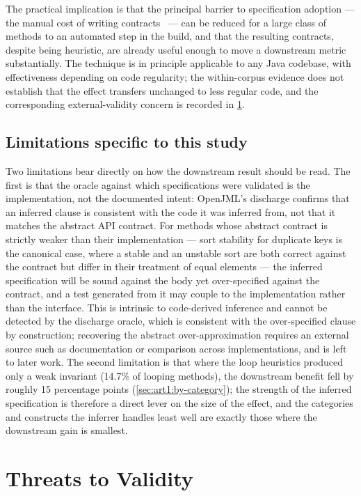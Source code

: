 The practical implication is that the principal barrier to specification adoption
--- the manual cost of writing contracts~\citep{meyer1992dbc,leavens2006jml} ---
can be reduced for a large class of methods to an automated step in the build, and
that the resulting contracts, despite being heuristic, are already useful enough to
move a downstream metric substantially. The technique is in principle applicable to
any Java codebase, with effectiveness depending on code regularity; the
within-corpus evidence does not establish that the effect transfers unchanged to
less regular code, and the corresponding external-validity concern is recorded in
\cref{sec:art1:threats}.

\subsection{Limitations specific to this study}
\label{sec:art1:limitations}

Two limitations bear directly on how the downstream result should be read. The
first is that the oracle against which specifications were validated is the
implementation, not the documented intent: OpenJML's discharge confirms that an
inferred clause is consistent with the code it was inferred from, not that it
matches the abstract API contract. For methods whose abstract contract is strictly
weaker than their implementation --- sort stability for duplicate keys is the
canonical case, where a stable and an unstable sort are both correct against the
contract but differ in their treatment of equal elements --- the inferred
specification will be sound against the body yet over-specified against the
contract, and a test generated from it may couple to the implementation rather than
the interface. This is intrinsic to code-derived inference and cannot be detected
by the discharge oracle, which is consistent with the over-specified clause by
construction; recovering the abstract over-approximation requires an external
source such as documentation or comparison across implementations, and is left to
later work. The second limitation is that where the loop heuristics produced only a
weak invariant (14.7\% of looping methods), the downstream benefit fell by roughly
15 percentage points (\cref{sec:art1:by-category}); the strength of the inferred
specification is therefore a direct lever on the size of the effect, and the
categories and constructs the inferrer handles least well are exactly those where
the downstream gain is smallest.

\section{Threats to Validity}
\label{sec:art1:threats}

